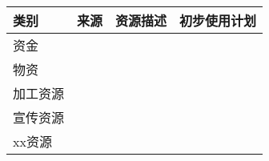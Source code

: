 \begin{longtable}{ X | X | X | X }

    \hline

    \endfoot
    
    \rowcolor{tabhdcolor}
    
        类别 &
        来源 &
        资源描述 &
        初步使用计划 \\
    
    \hline
    
    \endhead
    
        资金 &
        &
        &
        \\
    
    \hline
    
        物资 &
        &
        &
        \\
    
    \hline
    
        加工资源 &
        &
        &
        \\
    
    \hline
    
        宣传资源 &
        &
        &
        \\
    
    \hline
    
        xx资源 &
        &
        &
        \\
    
    \hline
    
\end{longtable}
